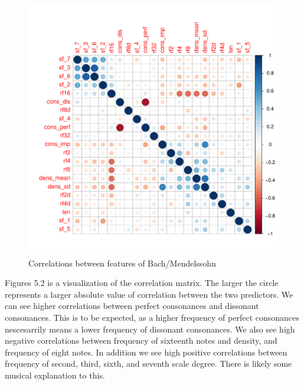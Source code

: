 \documentclass[12pt,twoside]{reedthesis}
\theoremstyle{definition}
\theoremstyle{definition}
\theoremstyle{definition}
\theoremstyle{remark}
\begin{document}
\begin{figure}[H]
\centering
\includegraphics[scale = .6]{images/cor_circles_b.pdf}
\caption{Correlations between features of Bach/Mendelssohn}
\label{subd}
\end{figure}
Figures 5.2 is a visualization of the correlation matrix. The larger the
circle represents a larger absolute value of correlation between the two
predictors. We can see higher correlations between perfect consonances
and dissonant consonances. This is to be expected, as a higher frequency
of perfect consonances nescesarrily means a lower frequency of dissonant
consonances. We also see high negative correlations between frequency of
sixteenth notes and density, and frequency of eight notes. In addition
we see high positive correlations between frequency of second, third,
sixth, and seventh scale degree. There is likely some musical
explanation to this.
\end{document}

